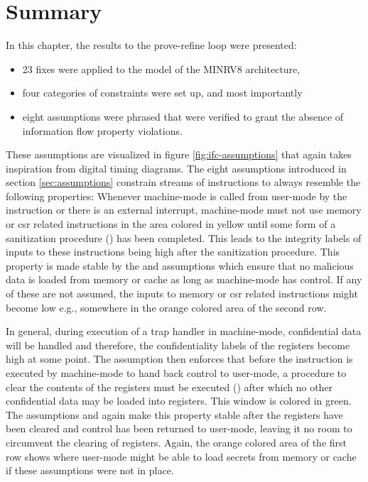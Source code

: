 \section{Summary}

In this chapter, the results to the prove-refine loop were presented:
\begin{itemize}
    \item 23 fixes were applied to the model of the MINRV8 architecture,
    \item four categories of  constraints were set up, and most importantly
    \item eight assumptions were phrased that were verified to grant the absence of information flow property violations.
\end{itemize}

These assumptions are visualized in figure \ref{fig:ifc-assumptions} that again takes inspiration from digital timing diagrams.
The eight assumptions introduced in section \ref{sec:assumptions} constrain streams of instructions to always resemble the following properties:
Whenever machine-mode is called from user-mode by the  instruction or there is an external interrupt, machine-mode must not use memory or \gls{csr} related instructions in the area colored in yellow until some form of a sanitization procedure () has been completed.
This leads to the integrity labels of inputs to these instructions being high after the sanitization procedure.
This property is made stable by the  and  assumptions which ensure that no malicious data is loaded from memory or cache as long as machine-mode has control.
If any of these are not assumed, the inputs to memory or \gls{csr} related instructions might become low e.g., somewhere in the orange colored area of the second row.

In general, during execution of a trap handler in machine-mode, confidential data will be handled and therefore, the confidentiality labels of the registers become high at some point.
The  assumption then enforces that before the  instruction is executed by machine-mode to hand back control to user-mode, a procedure to clear the contents of the registers must be executed () after which no other confidential data may be loaded into registers.
This window is colored in green.
The assumptions  and  again make this property stable after the registers have been cleared and control has been returned to user-mode, leaving it no room to circumvent the clearing of registers.
Again, the orange colored area of the first row shows where user-mode might be able to load secrets from memory or cache if these assumptions were not in place.


